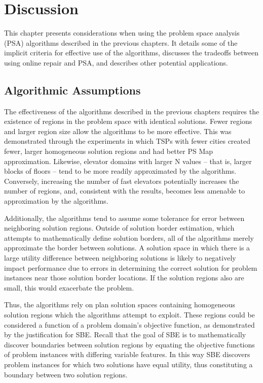 \chapter{Discussion}
\thispagestyle{plain}

\label{ch:application}

This chapter presents considerations when using the problem space analysis  (PSA) algorithms described in the previous chapters.  It details some of the implicit criteria  for effective use of the algorithms, discusses the tradeoffs between using online repair and PSA, and describes other potential applications.

\section{Algorithmic Assumptions}



The effectiveness of the algorithms described in the previous chapters requires the existence of regions in the problem space with identical solutions.  Fewer regions and larger region size allow the algorithms to be more effective.  This was demonstrated through the experiments in which  TSPs with fewer cities created fewer, larger homogeneous solution regions and had better PS Map approximation.  Likewise, elevator domains with larger N values -- that is, larger blocks of floors -- tend to be more readily approximated by the algorithms.  Conversely, increasing the number of fast elevators potentially increases the number of regions, and, consistent with the results, becomes less amenable to approximation by the algorithms.

Additionally, the algorithms tend to assume some tolerance for error between neighboring solution regions.  Outside of solution border estimation, which attempts to mathematically define solution borders, all of the algorithms merely approximate the border between solutions.  A solution space in which there is a large utility difference between neighboring solutions is likely to negatively impact performance due to errors in determining the correct solution for problem instances near those solution border locations.  If the solution regions also are small, this would exacerbate the problem.

Thus, the algorithms rely on plan solution spaces containing homogeneous solution regions which the algorithms attempt to exploit.  These regions could be considered a function of a problem domain's objective function, as demonstrated by the justification for SBE.  Recall that the goal of SBE is to mathematically discover boundaries between solution regions by equating the objective functions of problem instances with differing variable features.  In this way SBE discovers problem instances for which two solutions have equal utility, thus constituting a boundary between two solution regions.  


